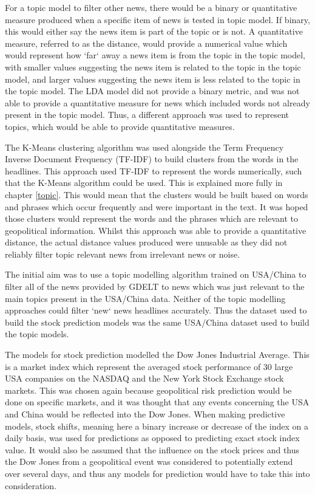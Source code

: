 For a topic model to filter other news, there would be a binary or quantitative measure produced when a specific item of news is tested in topic model. If binary, this would either say the news item is part of the topic or is not. A quantitative measure, referred to as the distance, would provide a numerical value which would represent how `far` away a news item is from the topic in the topic model, with smaller values suggesting the news item is related to the topic in the topic model, and larger values suggesting the news item is less related to the topic in the topic model. The LDA model did not provide a binary metric, and was not able to provide a quantitative measure for news which included words not already present in the topic model. Thus, a different approach was used to represent topics, which would be able to provide quantitative measures.  

The K-Means clustering algorithm was used alongside the Term Frequency Inverse Document Frequency (TF-IDF) to build clusters from the words in the headlines. This approach used TF-IDF to represent the words numerically, such that the K-Means algorithm could be used. This is explained more fully in chapter \ref{topic}. This would mean that the clusters would be built based on words and phrases which occur frequently and were important in the text. It was hoped those clusters would represent the words and the phrases which are relevant to geopolitical information. Whilst this approach was able to provide a quantitative distance, the actual distance values produced were unusable as they did not reliably filter topic relevant news from irrelevant news or noise. 

The initial aim was to use a topic modelling algorithm trained on USA/China to filter all of the news provided by GDELT to news which was just relevant to the main topics present in the USA/China data. Neither of the topic modelling approaches could filter `new` news headlines accurately. Thus the dataset used to build the stock prediction models was the same USA/China dataset used to build the topic models. 

The models for stock prediction modelled the Dow Jones Industrial Average. This is a market index which represent the averaged stock performance of 30 large USA companies on the NASDAQ and the New York Stock Exchange stock markets. This was chosen again because geopolitical risk prediction would be done on specific markets, and it was thought that any events concerning the USA and China would be reflected into the Dow Jones. When making predictive models, stock shifts, meaning here a binary increase or decrease of the index on a daily basis, was used for predictions as opposed to predicting exact stock index value. It would also be assumed that the influence on the stock prices and thus the Dow Jones from a geopolitical event was considered to potentially extend over several days, and thus any models for prediction would have to take this into consideration.


